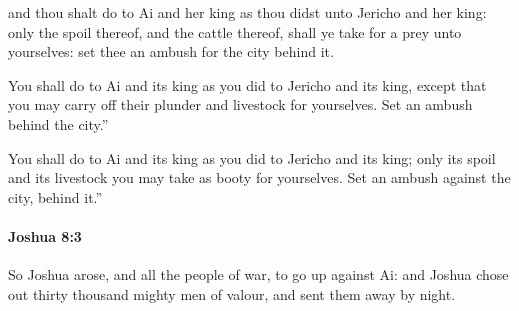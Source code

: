 			\begin{versebox}
					\item[BHS] 
					\item[ASV] and thou shalt do to Ai and her king as thou didst unto Jericho and her king: only the spoil thereof, and the cattle thereof, shall ye take for a prey unto yourselves: set thee an ambush for the city behind it.
					\item[NIV] You shall do to Ai and its king as you did to Jericho and its king, except that you may carry off their plunder and livestock for yourselves. Set an ambush behind the city.”
					\item[NRSV] You shall do to Ai and its king as you did to Jericho and its king; only its spoil and its livestock you may take as booty for yourselves. Set an ambush against the city, behind it.”
			\end{versebox}

		\paragraph{Joshua 8:3} %
			\label{JOSHUA-8-3}

			So Joshua arose, and all the people of war, to go up against Ai: and Joshua chose out thirty thousand mighty men of valour, and sent them away by night.

